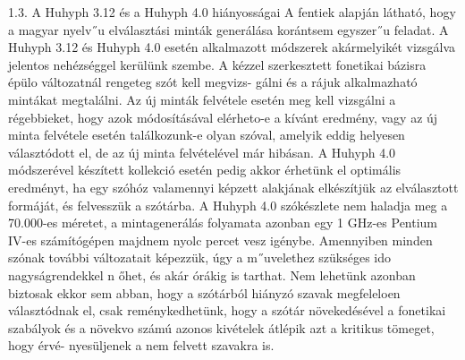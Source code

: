 \documentclass[11pt]{beamer}
\begin{document}
    \begin{frame}
        1.3. A Huhyph 3.12 és a Huhyph 4.0 hiányosságai
        A fentiek alapján látható, hogy a magyar nyelv˝u elválasztási minták generálása korántsem
        egyszer˝u feladat. A Huhyph 3.12 és Huhyph 4.0 esetén alkalmazott módszerek akármelyikét vizsgálva jelentos nehézséggel kerülünk szembe.
        A kézzel szerkesztett fonetikai bázisra épülo változatnál rengeteg szót kell megvizs-
        gálni és a rájuk alkalmazható mintákat megtalálni. Az új minták felvétele esetén meg kell
        vizsgálni a régebbieket, hogy azok módosításával elérheto-e a kívánt eredmény, vagy az új
        minta felvétele esetén találkozunk-e olyan szóval, amelyik eddig helyesen választódott el,
        de az új minta felvételével már hibásan.
        A Huhyph 4.0 módszerével készített kollekció esetén pedig akkor érhetünk el optimális eredményt, ha egy szóhóz valamennyi képzett alakjának elkészítjük az elválasztott
        formáját, és felvesszük a szótárba. A Huhyph 4.0 szókészlete nem haladja meg a 70.000-es
        méretet, a mintagenerálás folyamata azonban egy 1 GHz-es Pentium IV-es számítógépen
        majdnem nyolc percet vesz igénybe. Amennyiben minden szónak további változatait képezzük, úgy a m˝uvelethez szükséges ido nagyságrendekkel n őhet, és akár órákig is tarthat.
        Nem lehetünk azonban biztosak ekkor sem abban, hogy a szótárból hiányzó szavak megfeleloen választódnak el, csak reménykedhetünk, hogy a szótár növekedésével a fonetikai
        szabályok és a növekvo számú azonos kivételek átlépik azt a kritikus tömeget, hogy érvé-
        nyesüljenek a nem felvett szavakra is.

    \end{frame}
\end{document}
